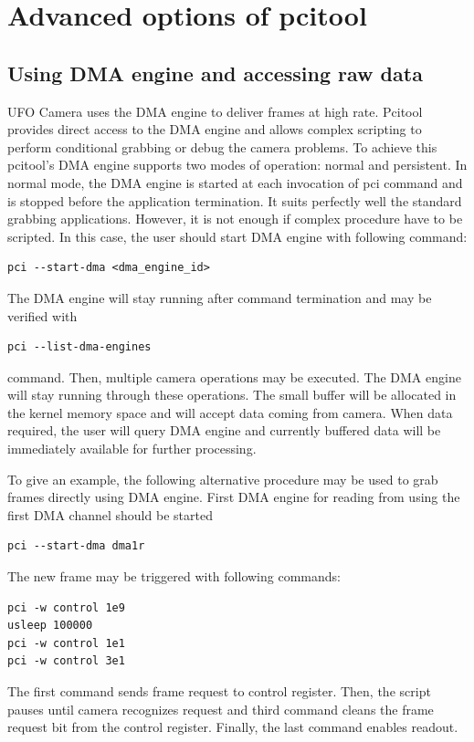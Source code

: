 \section{Advanced options of pcitool}

\subsection{Using DMA engine and accessing raw data}

UFO Camera uses the DMA engine to deliver frames at high rate. Pcitool provides direct access to the DMA engine and allows complex scripting to perform conditional grabbing or debug the camera problems. To achieve this pcitool's DMA engine supports two modes of operation: normal and persistent. In normal mode, the DMA engine is started at each invocation of pci command and is stopped before the application termination. It suits perfectly well the standard grabbing applications. However, it is not enough if complex procedure have to be scripted. In this case, the user should start DMA engine with following command:
\begin{verbatim}
pci --start-dma <dma_engine_id>
\end{verbatim}

The DMA engine will stay running after command termination and may be verified with 
\begin{verbatim}
pci --list-dma-engines
\end{verbatim}
command. Then, multiple camera operations may be executed. The DMA engine will stay running through these operations. The small buffer will be allocated in the kernel memory space and will accept data coming from camera. When data required, the user will query DMA engine and currently buffered data will be immediately available for further processing. 

To give an example, the following alternative procedure may be used to grab frames directly using DMA engine. First DMA engine for reading from using the first DMA channel should be started
\begin{verbatim}
pci --start-dma dma1r
\end{verbatim}

The new frame may be triggered with following commands:
\begin{verbatim}
pci -w control 1e9
usleep 100000
pci -w control 1e1
pci -w control 3e1
\end{verbatim}
The first command sends frame request to control register. Then, the script pauses until camera recognizes request and third command cleans the frame request bit from the control register. Finally, the last command enables readout.

